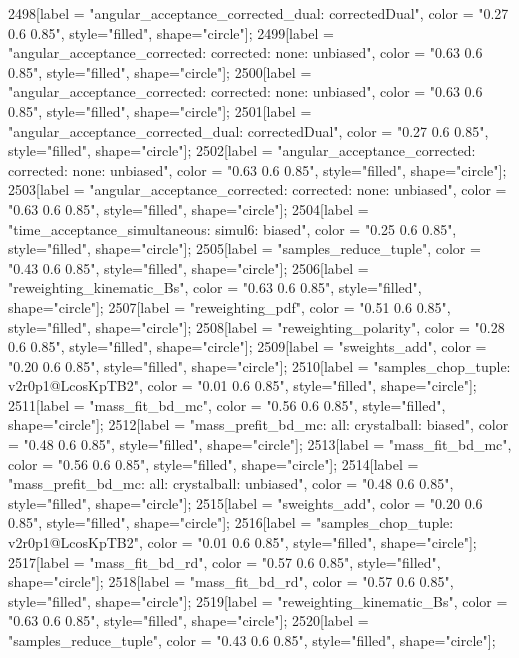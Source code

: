{	2498[label = "angular_acceptance_corrected_dual\nstep: correctedDual", color = "0.27 0.6 0.85", style="filled", shape="circle"];
	2499[label = "angular_acceptance_corrected\nangacc: corrected\ncsp: none\ntrigger: unbiased", color = "0.63 0.6 0.85", style="filled", shape="circle"];
	2500[label = "angular_acceptance_corrected\nangacc: corrected\ncsp: none\ntrigger: unbiased", color = "0.63 0.6 0.85", style="filled", shape="circle"];
	2501[label = "angular_acceptance_corrected_dual\nstep: correctedDual", color = "0.27 0.6 0.85", style="filled", shape="circle"];
	2502[label = "angular_acceptance_corrected\nangacc: corrected\ncsp: none\ntrigger: unbiased", color = "0.63 0.6 0.85", style="filled", shape="circle"];
	2503[label = "angular_acceptance_corrected\nangacc: corrected\ncsp: none\ntrigger: unbiased", color = "0.63 0.6 0.85", style="filled", shape="circle"];
	2504[label = "time_acceptance_simultaneous\ntimeacc: simul6\ntrigger: biased", color = "0.25 0.6 0.85", style="filled", shape="circle"];
	2505[label = "samples_reduce_tuple", color = "0.43 0.6 0.85", style="filled", shape="circle"];
	2506[label = "reweighting_kinematic_Bs", color = "0.63 0.6 0.85", style="filled", shape="circle"];
	2507[label = "reweighting_pdf", color = "0.51 0.6 0.85", style="filled", shape="circle"];
	2508[label = "reweighting_polarity", color = "0.28 0.6 0.85", style="filled", shape="circle"];
	2509[label = "sweights_add", color = "0.20 0.6 0.85", style="filled", shape="circle"];
	2510[label = "samples_chop_tuple\nversion: v2r0p1@LcosKpTB2", color = "0.01 0.6 0.85", style="filled", shape="circle"];
	2511[label = "mass_fit_bd_mc", color = "0.56 0.6 0.85", style="filled", shape="circle"];
	2512[label = "mass_prefit_bd_mc\nmassbin: all\nmassmodel: crystalball\ntrigger: biased", color = "0.48 0.6 0.85", style="filled", shape="circle"];
	2513[label = "mass_fit_bd_mc", color = "0.56 0.6 0.85", style="filled", shape="circle"];
	2514[label = "mass_prefit_bd_mc\nmassbin: all\nmassmodel: crystalball\ntrigger: unbiased", color = "0.48 0.6 0.85", style="filled", shape="circle"];
	2515[label = "sweights_add", color = "0.20 0.6 0.85", style="filled", shape="circle"];
	2516[label = "samples_chop_tuple\nversion: v2r0p1@LcosKpTB2", color = "0.01 0.6 0.85", style="filled", shape="circle"];
	2517[label = "mass_fit_bd_rd", color = "0.57 0.6 0.85", style="filled", shape="circle"];
	2518[label = "mass_fit_bd_rd", color = "0.57 0.6 0.85", style="filled", shape="circle"];
	2519[label = "reweighting_kinematic_Bs", color = "0.63 0.6 0.85", style="filled", shape="circle"];
	2520[label = "samples_reduce_tuple", color = "0.43 0.6 0.85", style="filled", shape="circle"];
}
